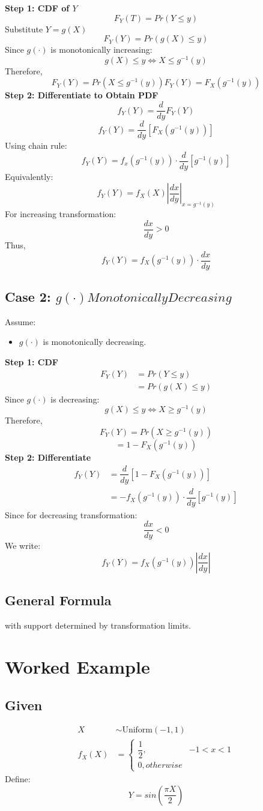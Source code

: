 \documentclass[11pt]{article}
\begin{document}
\textbf{Step 1: CDF of $Y$}
$$F_Y(T) = Pr(Y\leq y)$$
Substitute $Y = g(X)$
$$F_Y(Y) = Pr(g(X) \leq y)$$
Since $g(\cdot)$ is monotonically increasing:
$$g(X) \leq y \Longleftrightarrow X \leq g^{-1}(y)$$
Therefore,
$$
F_Y(Y) = Pr(X \leq g^{-1}(y))
F_Y(Y) = F_X(g^{-1}(y))
$$
\textbf{Step 2: Differentiate to Obtain PDF}
$$
f_Y(Y) = \dfrac{d}{dy}F_Y(Y)$$$$
f_Y(Y) = \dfrac{d}{dy}\left[ F_X(g^{-1}(y)) \right]
$$
Using chain rule:
$$f_Y(Y) = f_x(g^{-1}(y))\cdot\dfrac{d}{dy}[g^{-1}(y)]$$
Equivalently: $$f_Y(Y) = f_X(X)\left|\dfrac{dx}{dy}\right|_{x=g^{-1}(y)}$$
For increasing transformation: $$\dfrac{dx}{dy} > 0$$
Thus, $$f_Y(Y) = f_X(g^{-1}(y))\cdot\dfrac{dx}{dy}$$
\subsection{Case 2: $g(\cdot) Monotonically Decreasing$}
Assume:
\begin{itemize}
	\item $g(\cdot)$ is monotonically decreasing.
\end{itemize}
\textbf{Step 1: CDF}
\begin{align*}
	F_Y(Y) &= Pr(Y \leq y) \\
	&= Pr(g(X) \leq y)
\end{align*}
Since $g(\cdot)$ is decreasing:
$$g(X) \leq y \Longleftrightarrow X \geq g^{-1}(y)$$
Therefore,
$$F_Y(Y) = Pr(X \geq g^{-1}(y))$$
$$ = 1 - F_X(g^{-1}(y))$$
\textbf{Step 2: Differentiate}
\begin{align*}
	f_Y(Y) &= \dfrac{d}{dy}\left[ 1 - F_X(g^{-1}(y)) \right]\\
	&= -f_X(g^{-1}(y))\cdot\dfrac{d}{dy}[g^{-1}(y)]
\end{align*}
Since for decreasing transformation:
$$\dfrac{dx}{dy}<0$$
We write:
$$f_Y(Y) = f_X(g^{-1}(y))\left| \dfrac{dx}{dy} \right|$$

\subsection{General Formula}
\begin{center}
\end{center}
with support determined by transformation limits.

\section{Worked Example}
\subsection{Given}
\begin{align*}
	X &\sim \text{Uniform}(-1, 1)\\
	f_X(X) &= \begin{cases}
		\dfrac{1}{2}, & -1 < x < 1 \\
		0, otherwise
	\end{cases}
\end{align*}
Define:
$$Y = sin\left( \dfrac{\pi X}{2} \right)$$
\end{document}
